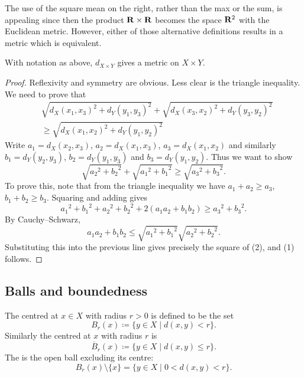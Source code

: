 The use of the square mean on the right, rather than the max or the sum, is appealing since then the product $\mathbf R\times\mathbf R$ becomes the space $\mathbf R^2$ with the Euclidean metric. However, either of those alternative definitions results in a metric which is equivalent.

\begin{proposition}
With notation as above, $d_{X\times Y}$ gives a metric on $X\times Y$.
\end{proposition}

\begin{proof}
Reflexivity and symmetry are obvious. Less clear is the triangle inequality. We need to prove that
\begin{equation*}\tag{1}
\begin{split}
&\sqrt{d_X(x_1,x_3)^2+d_Y(y_1,y_3)^2}+\sqrt{d_X(x_3,x_2)^2+d_Y(y_3,y_2)^2}\\
&\ge\sqrt{d_X(x_1,x_2)^2+d_Y(y_1,y_2)^2}
\end{split}
\end{equation*}
Write $a_1=d_X(x_2,x_3)$, $a_2=d_X(x_1,x_3)$, $a_3=d_X(x_1,x_2)$ and similarly $b_1=d_Y(y_2,y_3)$, $b_2=d_Y(y_1,y_3)$ and $b_3=d_Y(y_1,y_2)$. Thus we want to show
\begin{equation*}\tag{2}
\sqrt{{a_2}^2+{b_2}^2}+\sqrt{{a_1}^2+{b_1}^2}\ge\sqrt{{a_3}^2+{b_3}^2}.
\end{equation*}
To prove this, note that from the triangle inequality we have $a_1+a_2\ge a_3$, $b_1+b_2\ge b_3$. Squaring and adding gives
\[{a_1}^2+{b_1}^2+{a_2}^2+{b_2}^2+2(a_1a_2+b_1b_2)\ge {a_3}^2+{b_3}^2.\]
By Cauchy--Schwarz,
\[a_1a_2+b_1b_2\le\sqrt{{a_1}^2+{b_1}^2}\sqrt{{a_2}^2+{b_2}^2}.\]
Substituting this into the previous line gives precisely the square of (2), and (1) follows.
\end{proof}

\subsection{Balls and boundedness}
\begin{definition}[Balls]
The  centred at $x\in X$ with radius $r>0$ is defined to be the set
\[B_r(x)\coloneqq\{y\in X\mid d(x,y)<r\}.\]
Similarly the  centred at $x$ with radius $r$ is
\[\overline{B}_r(x)\coloneqq\{y\in X\mid d(x,y)\le r\}.\]
The  is the open ball excluding its centre:
\[B_r(x)\setminus\{x\}=\{y\in X\mid 0<d(x,y)<r\}.\]
\end{definition}

